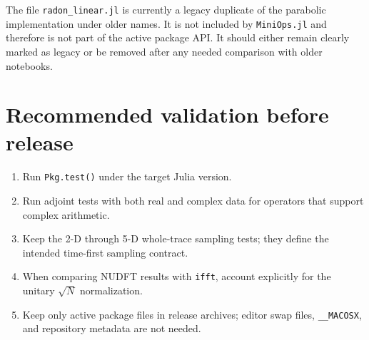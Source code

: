 \documentclass[11pt]{article}
\begin{document}
The file \texttt{radon\_linear.jl} is currently a legacy duplicate of the
parabolic implementation under older names. It is not included by
\texttt{MiniOps.jl} and therefore is not part of the active package API.
It should either remain clearly marked as legacy or be removed after any
needed comparison with older notebooks.

\section{Recommended validation before release}
\begin{enumerate}
  \item Run \texttt{Pkg.test()} under the target Julia version.
  \item Run adjoint tests with both real and complex data for operators that
        support complex arithmetic.
  \item Keep the 2-D through 5-D whole-trace sampling tests; they define the
        intended time-first sampling contract.
  \item When comparing NUDFT results with \texttt{ifft}, account explicitly
        for the unitary $\sqrt{N}$ normalization.
  \item Keep only active package files in release archives; editor swap
        files, \texttt{\_\_MACOSX}, and repository metadata are not needed.
\end{enumerate}
\end{document}
